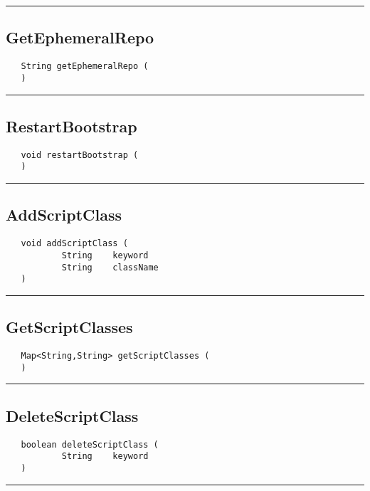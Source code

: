 \rule{15cm}{2pt}
\subsection{GetEphemeralRepo}
\label{Api:GetEphemeralRepo}
\begin{verbatim}
   String getEphemeralRepo (
   )
\end{verbatim}



\rule{15cm}{2pt}
\subsection{RestartBootstrap}
\label{Api:RestartBootstrap}
\begin{verbatim}
   void restartBootstrap (
   )
\end{verbatim}



\rule{15cm}{2pt}
\subsection{AddScriptClass}
\label{Api:AddScriptClass}
\begin{verbatim}
   void addScriptClass (
           String    keyword
           String    className
   )
\end{verbatim}



\rule{15cm}{2pt}
\subsection{GetScriptClasses}
\label{Api:GetScriptClasses}
\begin{verbatim}
   Map<String,String> getScriptClasses (
   )
\end{verbatim}



\rule{15cm}{2pt}
\subsection{DeleteScriptClass}
\label{Api:DeleteScriptClass}
\begin{verbatim}
   boolean deleteScriptClass (
           String    keyword
   )
\end{verbatim}



\rule{15cm}{2pt}
